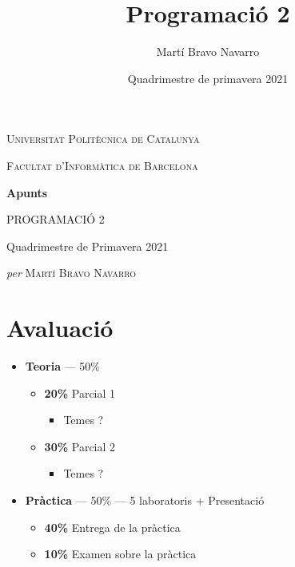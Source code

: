 \documentclass[12pt, a4paper, twoside]{report}
\title{Programació 2}
\author{Martí Bravo Navarro}
\date{Quadrimestre de primavera 2021}
\begin{document}
\begin{titlepage}
	\centering
	\vspace*{\baselineskip} 
    {\scshape Universitat Politècnica de Catalunya}
    \vspace{0.25\baselineskip}

    {\scshape\Large Facultat d'Informàtica de Barcelona}
	\vspace{10\baselineskip}

    \textbf{\Large Apunts}
    \vspace{0.75\baselineskip}

	{\LARGE PROGRAMACIÓ 2\\}

	\vspace{0.75\baselineskip}
	\vspace{10\baselineskip}
    Quadrimestre de Primavera 2021
	\vspace*{3\baselineskip} 

    \textit{per}
	\vspace{0.5\baselineskip}
	{\scshape\Large Martí Bravo Navarro}
	\vspace{0.5\baselineskip}
	\vfill
	

\end{titlepage}


\tableofcontents
\clearpage

\section*{Avaluació}
\begin{itemize}
    \item \textbf{Teoria} --- 50\%
    \begin{itemize}
        \item \textbf{20\%} Parcial 1
        \begin{itemize}
            \item Temes ?
        \end{itemize}
        \item \textbf{30\%} Parcial 2
        \begin{itemize}
            \item Temes ?     
        \end{itemize}
    \end{itemize}
    \item \textbf{Pràctica}   --- 50\% --- 5 laboratoris + Presentació
    \begin{itemize}
        \item \textbf{40\%} Entrega de la pràctica
        \item \textbf{10\%} Examen sobre la pràctica
        
    \end{itemize}
  \end{itemize}
\end{document}
